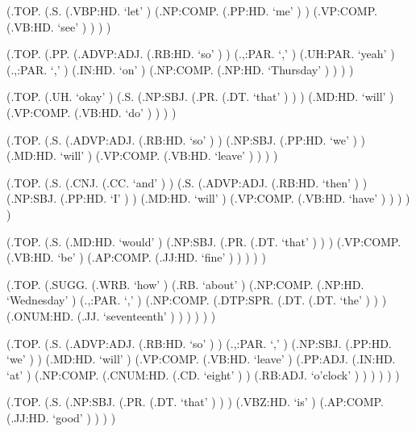 \documentclass[10pt]{article}
\begin{document}
\begin{parsetree}  (.TOP. (.S. (.VBP:HD. `let' ) (.NP:COMP. (.PP:HD. `me' ) ) (.VP:COMP. (.VB:HD. `see' ) ) ) ) \end{parsetree}

\begin{parsetree}  (.TOP. (.PP. (.ADVP:ADJ. (.RB:HD. `so' ) ) (.,:PAR. `,' ) (.UH:PAR. `yeah' ) (.,:PAR. `,' ) (.IN:HD. `on' ) (.NP:COMP. (.NP:HD. `Thursday' ) ) ) ) \end{parsetree}

\begin{parsetree}  (.TOP. (.UH. `okay' ) (.S. (.NP:SBJ. (.PR. (.DT. `that' ) ) ) (.MD:HD. `will' ) (.VP:COMP. (.VB:HD. `do' ) ) ) ) \end{parsetree}

\begin{parsetree}  (.TOP. (.S. (.ADVP:ADJ. (.RB:HD. `so' ) ) (.NP:SBJ. (.PP:HD. `we' ) ) (.MD:HD. `will' ) (.VP:COMP. (.VB:HD. `leave' ) ) ) ) \end{parsetree}

\begin{parsetree}  (.TOP. (.S. (.CNJ. (.CC. `and' ) ) (.S. (.ADVP:ADJ. (.RB:HD. `then' ) ) (.NP:SBJ. (.PP:HD. `I' ) ) (.MD:HD. `will' ) (.VP:COMP. (.VB:HD. `have' ) ) ) ) ) \end{parsetree}

\begin{parsetree}  (.TOP. (.S. (.MD:HD. `would' ) (.NP:SBJ. (.PR. (.DT. `that' ) ) ) (.VP:COMP. (.VB:HD. `be' ) (.AP:COMP. (.JJ:HD. `fine' ) ) ) ) ) \end{parsetree}

\begin{parsetree}  (.TOP. (.SUGG. (.WRB. `how' ) (.RB. `about' ) (.NP:COMP. (.NP:HD. `Wednesday' ) (.,:PAR. `,' ) (.NP:COMP. (.DTP:SPR. (.DT. (.DT. `the' ) ) ) (.ONUM:HD. (.JJ. `seventeenth' ) ) ) ) ) ) \end{parsetree}

\begin{parsetree}  (.TOP. (.S. (.ADVP:ADJ. (.RB:HD. `so' ) ) (.,:PAR. `,' ) (.NP:SBJ. (.PP:HD. `we' ) ) (.MD:HD. `will' ) (.VP:COMP. (.VB:HD. `leave' ) (.PP:ADJ. (.IN:HD. `at' ) (.NP:COMP. (.CNUM:HD. (.CD. `eight' ) ) (.RB:ADJ. `o'clock' ) ) ) ) ) ) \end{parsetree}

\begin{parsetree}  (.TOP. (.S. (.NP:SBJ. (.PR. (.DT. `that' ) ) ) (.VBZ:HD. `is' ) (.AP:COMP. (.JJ:HD. `good' ) ) ) ) \end{parsetree}
\end{document}
